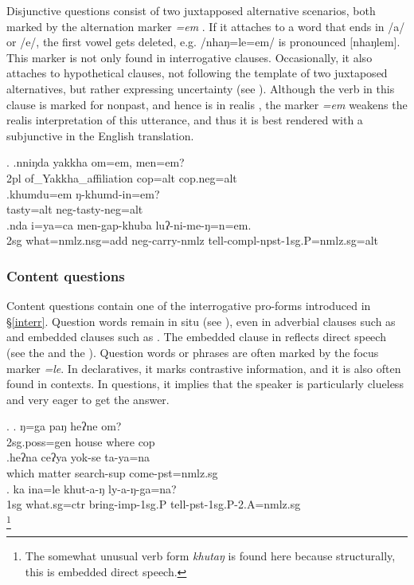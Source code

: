  Disjunctive questions consist of two juxtapposed alternative scenarios, both marked by the alternation marker \emph{=em} \Next. If it attaches to a word that ends in /a/ or /e/, the first vowel gets deleted, e.g. /nhaŋ=le=em/  is pronounced	[nhaŋlem]. This marker is not only found in interrogative clauses. Occasionally, it also attaches to hypothetical clauses, not following the template of two juxtaposed alternatives, but rather expressing uncertainty (see \Next[c]). Although the verb in this clause is marked for nonpast, and hence is in realis , the marker \emph{=em} weakens the realis interpretation of this utterance, and thus it is best rendered with a subjunctive in the English translation.
 
 \ex. \ag.nniŋda yakkha          om=em,    men=em?\\
 {\sc 2pl} of\_Yakkha\_affiliation {\sc cop=alt} {\sc cop.neg=alt}\\
  
 \bg.khumdu=em ŋ-khumd-in=em?\\
 tasty{\sc =alt} {\sc neg-}tasty{\sc -neg=alt}\\
 \bg.nda i=ya=ca men-gap-khuba luʔ-ni-me-ŋ=n=em.\\
 {\sc 2sg} what{\sc =nmlz.nsg=add} {\sc neg-}carry{\sc -nmlz} tell{\sc -compl-npst-1sg.P=nmlz.sg=alt}\\
  
 
\subsubsection{Content questions}

Content questions contain one of the interrogative pro-forms introduced in §\ref{interr}. Question words remain in situ (see \Next[a]), even in adverbial clauses such as \Next[b] and embedded clauses such as \Next[c]. The embedded clause in \Next[c] reflects direct speech (see the  and the ). Question words or phrases are often marked by the focus marker \emph{=le}. In declaratives, it marks contrastive information,  and it is also often found in  contexts. In questions, it implies that the speaker is particularly clueless and very eager to get the answer.

\ex. \ag. ŋ=ga          paŋ  heʔne om?\\
{\sc 2sg.poss=gen} house where {\sc cop}\\
 
\bg.heʔna ceʔya yok-se ta-ya=na\\
which  matter search{\sc -sup} come{\sc [3sg]-pst=nmlz.sg}\\
\bg. ka ina=le khut-a-ŋ ly-a-ŋ-ga=na?\\
{\sc 1sg} what{\sc .sg=ctr} bring{\sc -imp-1sg.P} tell{\sc -pst-1sg.P-2.A=nmlz.sg}\\
\footnote{The somewhat unusual verb form \emph{khutaŋ}  is found here because structurally, this is embedded direct speech.}


